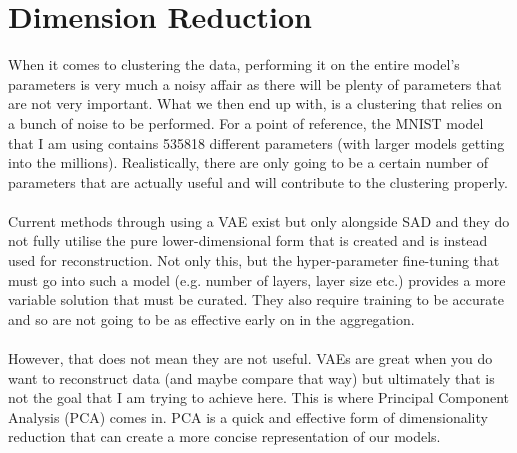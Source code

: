 \section{Dimension Reduction}
When it comes to clustering the data, performing it on the entire model's parameters is very much a noisy affair as there will be plenty of parameters that are not very important.
What we then end up with, is a clustering that relies on a bunch of noise to be performed.
For a point of reference, the MNIST model that I am using contains 535818 different parameters (with larger models getting into the millions).
Realistically, there are only going to be a certain number of parameters that are actually useful and will contribute to the clustering properly.
\\ \\
Current methods through using a VAE exist but only alongside SAD and they do not fully utilise the pure lower-dimensional form that is created and is instead used for reconstruction.
Not only this, but the hyper-parameter fine-tuning that must go into such a model (e.g. number of layers, layer size etc.) provides a more variable solution that must be curated.
They also require training to be accurate and so are not going to be as effective early on in the aggregation.
\\ \\
However, that does not mean they are not useful.
VAEs are great when you do want to reconstruct data (and maybe compare that way) but ultimately that is not the goal that I am trying to achieve here.
This is where Principal Component Analysis (PCA) comes in.
PCA is a quick and effective form of dimensionality reduction that can create a more concise representation of our models.


